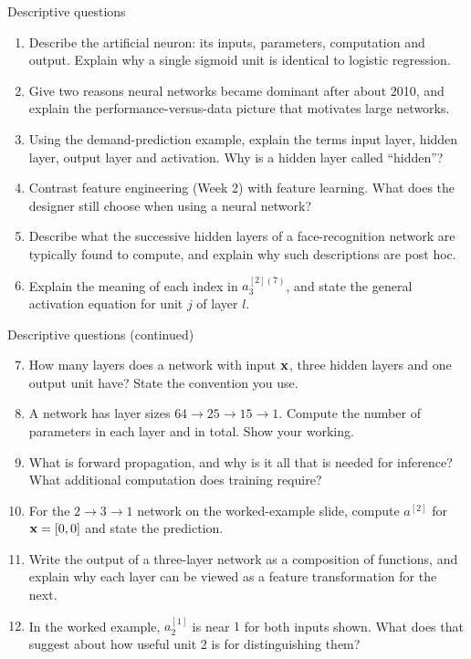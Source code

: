 \documentclass[aspectratio=169,10pt]{beamer}
\begin{document}
\begin{frame}{Descriptive questions}
  \footnotesize
  \begin{enumerate}
    \item Describe the artificial neuron: its inputs, parameters, computation and output.
          Explain why a single sigmoid unit is identical to logistic regression. \hfill{}
    \item Give two reasons neural networks became dominant after about 2010, and explain the
          performance-versus-data picture that motivates large networks. \hfill{}
    \item Using the demand-prediction example, explain the terms input layer, hidden layer,
          output layer and activation. Why is a hidden layer called ``hidden''? \hfill{}
    \item Contrast feature engineering (Week 2) with feature learning. What does the designer
          still choose when using a neural network? \hfill{}
    \item Describe what the successive hidden layers of a face-recognition network are
          typically found to compute, and explain why such descriptions are post hoc.
          \hfill{}
    \item Explain the meaning of each index in $a^{[2](7)}_3$, and state the general
          activation equation for unit $j$ of layer $l$. \hfill{}
  \end{enumerate}
\end{frame}

\begin{frame}{Descriptive questions (continued)}
  \footnotesize
  \begin{enumerate}\setcounter{enumi}{6}
    \item How many layers does a network with input $\mathbf{x}$, three hidden layers and one output
          unit have? State the convention you use. \hfill{}
    \item A network has layer sizes $64\to25\to15\to1$. Compute the number of parameters in
          each layer and in total. Show your working. \hfill{}
    \item What is forward propagation, and why is it all that is needed for inference? What
          additional computation does training require? \hfill{}
    \item For the $2\to3\to1$ network on the worked-example slide, compute $a^{[2]}$ for
          $\mathbf{x}=[0,0]$ and state the prediction. \hfill{}
    \item Write the output of a three-layer network as a composition of functions, and
          explain why each layer can be viewed as a feature transformation for the next.
          \hfill{}
    \item In the worked example, $a^{[1]}_2$ is near $1$ for both inputs shown. What does that
          suggest about how useful unit 2 is for distinguishing them? \hfill{}
  \end{enumerate}
\end{frame}
\end{document}
